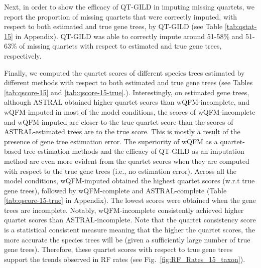 Next, in order to show the efficacy of QT-GILD in imputing missing quartets, we report the proportion of missing quartets that were correctly imputed, with respect to both estimated and true gene trees, by QT-GILD (see Table \ref{tab:qstat-15} in Appendix). QT-GILD was able to correctly impute around 51-58\% and 51-63\% of missing quartets with respect to estimated and true gene trees, respectively. %


Finally, we computed the quartet scores of different species trees estimated by different methods with respect to both estimated and true gene trees (see Tables \ref{tab:qscore-15} and \ref{tab:qscore-15-true}.). Interestingly, on estimated gene trees, although ASTRAL obtained higher quartet scores than wQFM-incomplete, and wQFM-imputed in most of the model conditions, the scores of wQFM-incomplete and wQFM-imputed are closer to the true quartet score than the scores of ASTRAL-estimated trees are to the true score. This is mostly a result of the presence of gene tree estimation error. %
The superiority of wQFM as a quartet-based tree estimation methods and the efficacy of QT-GILD as an imputation method are even more evident from the quartet scores when they are computed with respect to the true gene trees (i.e., no estimation error). 
Across all the model conditions, wQFM-imputed obtained the highest quartet scores (w.r.t true gene trees), followed by wQFM-complete and ASTRAL-complete (Table \ref{tab:qscore-15-true} in Appendix). The lowest scores were obtained when the gene trees are incomplete. Notably, wQFM-incomplete consistently achieved higher quartet scores than ASTRAL-incomplete. Note that the quartet consistency score is a statistical consistent measure meaning that the higher the quartet scores, the more accurate the species trees will be (given a sufficiently large number of true gene trees). Therefore, these quartet scores with respect to true gene trees support the trends observed in RF rates (see Fig.~\ref{fig:RF_Rates_15_taxon}). 


